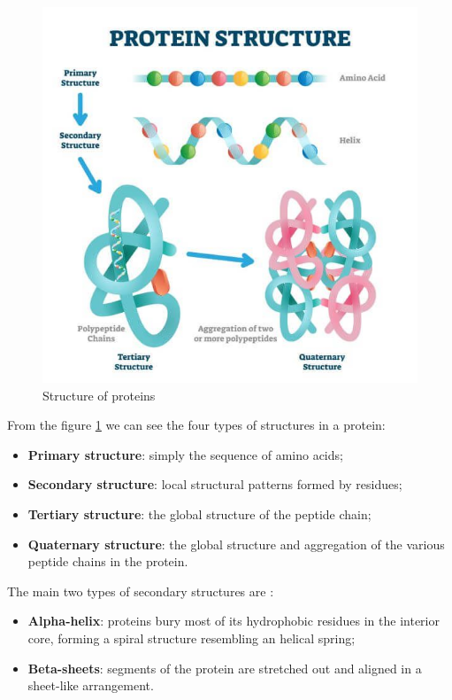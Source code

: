 \begin{figure}[h!]
	\includegraphics[scale=0.75]{res/proteins_overview/protein_structure.png}
	\centering
	\caption{Structure of proteins}
	\label{fig:protein-structure}
\end{figure}

From the figure \ref{fig:protein-structure} we can see the four types of structures in a protein:

\begin{itemize}
	\item \textbf{Primary structure}: simply the sequence of amino acids;
	\item \textbf{Secondary structure}: local structural patterns formed by residues;
	\item \textbf{Tertiary structure}: the global structure of the peptide chain;
	\item \textbf{Quaternary structure}: the global structure and aggregation of the various peptide chains in the protein. 
\end{itemize}

\vspace{2em}

The main two types of secondary structures are :

\begin{itemize}
	\item \textbf{Alpha-helix}: proteins bury most of its hydrophobic residues in the interior core, forming a spiral structure resembling an helical spring;
	\item \textbf{Beta-sheets}: segments of the protein are stretched out and aligned in a sheet-like arrangement.
\end{itemize}
\vspace{6em}
\pagebreak
